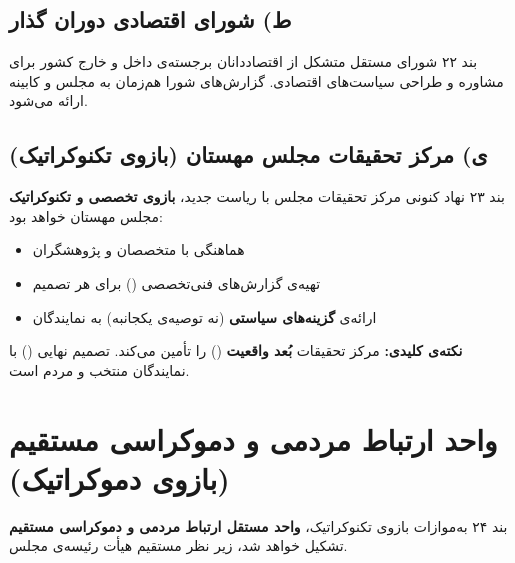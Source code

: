 \subsection{ط) شورای اقتصادی دوران گذار}

\begin{bandbox}{بند ۲۲}
	شورای مستقل متشکل از اقتصاددانان برجسته‌ی داخل و خارج کشور برای مشاوره و طراحی
	سیاست‌های اقتصادی. گزارش‌های شورا هم‌زمان به مجلس و کابینه ارائه می‌شود.
\end{bandbox}

\subsection{ی) مرکز تحقیقات مجلس مهستان (بازوی تکنوکراتیک)}

\begin{bandbox}{بند ۲۳}
	نهاد کنونی مرکز تحقیقات مجلس با ریاست جدید، \textbf{بازوی تخصصی و تکنوکراتیک}
	مجلس مهستان خواهد بود:
	\begin{itemize}
		\item هماهنگی با متخصصان و پژوهشگران
		\item تهیه‌ی گزارش‌های فنی‌تخصصی () برای هر تصمیم
		\item ارائه‌ی \textbf{گزینه‌های سیاستی} (نه توصیه‌ی یکجانبه) به نمایندگان
	\end{itemize}
	\begin{quotebox}
		\textbf{نکته‌ی کلیدی:} مرکز تحقیقات \textbf{بُعد واقعیت} () را تأمین
		می‌کند. تصمیم نهایی () با نمایندگان منتخب و مردم است.
	\end{quotebox}
\end{bandbox}

\section{واحد ارتباط مردمی و دموکراسی مستقیم (بازوی دموکراتیک)}

\begin{bandbox}{بند ۲۴}
	به‌موازات بازوی تکنوکراتیک، \textbf{واحد مستقل ارتباط مردمی و دموکراسی مستقیم}
	تشکیل خواهد شد، زیر نظر مستقیم هیأت رئیسه‌ی مجلس.
\end{bandbox}

